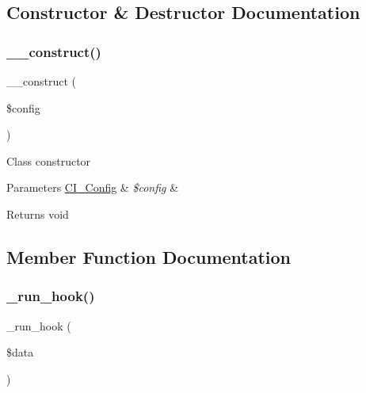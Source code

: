 \subsection{Constructor \& Destructor Documentation}
\mbox{\label{class_c_i___hooks_ab7da97fbbffcd188093b4674ef948335}} 
\subsubsection{\texorpdfstring{\+\_\+\+\_\+construct()}{\_\_construct()}}
{\footnotesize\ttfamily \+\_\+\+\_\+construct (\begin{DoxyParamCaption}\item[{\mbox{\hyperlink{class_c_i___config}{C\+I\+\_\+\+Config}}}]{\$config }\end{DoxyParamCaption})}

Class constructor


\begin{DoxyParams}[1]{Parameters}
\mbox{\hyperlink{class_c_i___config}{C\+I\+\_\+\+Config}} & {\em \$config} & \\
\hline
\end{DoxyParams}
\begin{DoxyReturn}{Returns}
void 
\end{DoxyReturn}


\subsection{Member Function Documentation}
\mbox{\label{class_c_i___hooks_a2cd07b3fcfaf153a37f164d3fbc7c3d9}} 
\subsubsection{\texorpdfstring{\+\_\+run\+\_\+hook()}{\_run\_hook()}}
{\footnotesize\ttfamily \+\_\+run\+\_\+hook (\begin{DoxyParamCaption}\item[{}]{\$data }\end{DoxyParamCaption})\hspace{0.3cm}{\ttfamily [protected]}}

